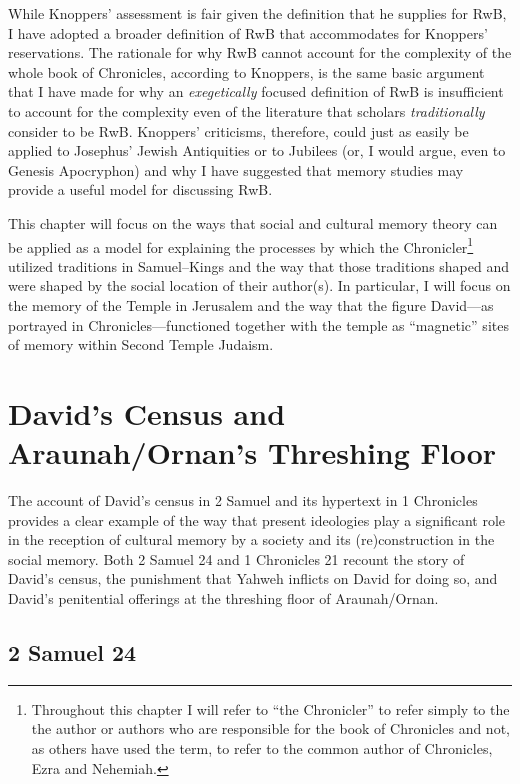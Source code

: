 While Knoppers' assessment is fair given the definition that he supplies
for RwB, I have adopted a broader definition of RwB that accommodates
for Knoppers' reservations. The rationale for why RwB cannot account for
the complexity of the whole book of Chronicles, according to Knoppers,
is the same basic argument that I have made for why an
\emph{exegetically} focused definition of RwB is insufficient to account
for the complexity even of the literature that scholars
\emph{traditionally} consider to be RwB. Knoppers' criticisms,
therefore, could just as easily be applied to Josephus'
Jewish Antiquities or to Jubilees (or, I would argue, even to
Genesis Apocryphon) and why I have suggested that memory studies may
provide a useful model for discussing RwB.

This chapter will focus on the ways that social and cultural memory
theory can be applied as a model for explaining the processes by which
the Chronicler\footnote{Throughout this chapter I will refer to ``the
  Chronicler'' to refer simply to the the author or authors who are
  responsible for the book of Chronicles and not, as others have used
  the term, to refer to the common author of Chronicles, Ezra and
  Nehemiah.} utilized traditions in Samuel--Kings and the way that those
traditions shaped and were shaped by the social location of their
author(s). In particular, I will focus on the memory of the Temple in
Jerusalem and the way that the figure David---as portrayed in
Chronicles---functioned together with the temple as ``magnetic'' sites
of memory within Second Temple Judaism.\autocite[73]{benzvi_st2017}

\section{David's Census and Araunah/Ornan's Threshing
Floor}\label{davids-census-and-araunahornans-threshing-floor}

The account of David's census in 2 Samuel and its hypertext in 1
Chronicles provides a clear example of the way that present ideologies
play a significant role in the reception of cultural memory by a society
and its (re)construction in the social memory. Both 2 Samuel 24 and 1
Chronicles 21 recount the story of David's census, the punishment that
Yahweh inflicts on David for doing so, and David's penitential offerings
at the threshing floor of Araunah/Ornan.

\subsection{2 Samuel 24}\label{samuel-24}

